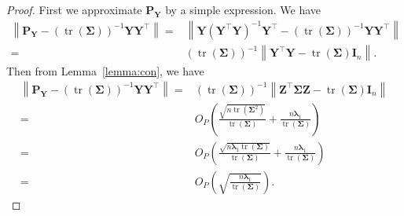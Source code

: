 \documentclass[10pt]{book}
\theoremstyle{definition}
\DeclareMathOperator{\mytr}{tr}
\newcommand{\bZ}{\mathbf{Z}}
\newcommand{\bP}{\mathbf{P}}
\newcommand{\bY}{\mathbf{Y}}
\newcommand{\bI}{\mathbf{I}}
\newcommand{\bfsym}[1]{\ensuremath{\boldsymbol{#1}}}
\def\blambda {\bfsym {\lambda}}
\def\bSigma {\bfsym {\Sigma}}
\begin{document}
\begin{proof}
    First we approximate $\bP_{\bY}$ by a simple expression.
    We have
        \begin{equation*}
            \begin{split}
        \left\|
        \bP_{\bY}
        -(\mytr(\bSigma))^{-1} \bY \bY^\top
        \right\|
        =  
        &
        \left\|
        \bY (\bY^\top \bY)^{-1} \bY^\top
    -(\mytr(\bSigma))^{-1} \bY \bY^\top
        \right\|
        \\
        =&
        (\mytr(\bSigma))^{-1}
        \left\|
        \bY^\top \bY -\mytr(\bSigma)\bI_n
        \right\|.
            \end{split}
        \end{equation*}
        Then from Lemma~\ref{lemma:con}, we have
        \begin{equation}\label{fenEq1}
            \begin{split}
        \left\|
        \bP_{\bY}
        -(\mytr(\bSigma))^{-1} \bY \bY^\top
        \right\|
        =&
        (\mytr(\bSigma))^{-1}
        \left\|
        \bZ^\top \bSigma \bZ -\mytr(\bSigma)\bI_n
        \right\|
        \\
        =&O_P\left(
            \frac{\sqrt{n\mytr(\bSigma^2)}} {\mytr(\bSigma)}
            +\frac{n\blambda_1}{\mytr(\bSigma)}
        \right)
        \\
        =&O_P\left(
            \frac{\sqrt{n\blambda_1\mytr(\bSigma)}} {\mytr(\bSigma)}
            +\frac{n\blambda_1}{\mytr(\bSigma)}
        \right)
        \\
        =&O_P\left(
            \sqrt{\frac{n\blambda_1} {\mytr(\bSigma)}}
        \right).
        \end{split}
        \end{equation}


\end{proof}
\end{document}
